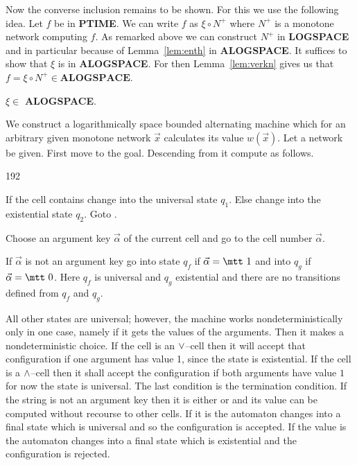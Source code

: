 Now the converse inclusion remains to be shown. For this we use
the following idea. Let $f$ be in \textbf{PTIME}. We can write $f$ as
$\xi \circ N^+$ where $N^+$ is a monotone network computing $f$. As
remarked above we can construct $N^+$ in \textbf{LOGSPACE} and in
particular because of Lemma~\ref{lem:enth} in \textbf{ALOGSPACE}.
It suffices to show that $\xi$ is in \textbf{ALOGSPACE}. For then
Lemma~\ref{lem:verkn} gives us that $f = \xi \circ N^+ \in 
\textbf{ALOGSPACE}$.
\begin{lem}
$\xi \in$ \textbf{ALOGSPACE}.
\end{lem}
\proofbeg
We construct a logarithmically space bounded alternating
machine which for an arbitrary given monotone network
$\vec{x}$ calculates its value $w(\vec{x})$. Let a network 
be given. First move to the goal. Descending from it
compute as follows.
\begin{dingautolist}{192}
\item
If the cell contains {\mtt{}} change into the universal 
state $q_1$. Else change into the existential state $q_2$. 
Goto .
\item
Choose an argument key $\vec{\alpha}$ of the current
cell and go to the cell number $\vec{\alpha}$.
\item
If $\vec{\alpha}$ is not an argument key go into state
$q_f$ if $\vec{\alpha} = \mbox{\mtt 1}$ and into $q_g$ if
$\vec{\alpha} = \mbox{\mtt 0}$.
Here $q_f$ is universal and $q_g$ existential
and there are no transitions defined from $q_f$ and $q_g$.
\end{dingautolist}
All other states are universal; however, the machine works
nondeterministically only in one case, namely if it gets the
values of the arguments. Then it makes a nondeterministic choice.
If the cell is an $\vee$--cell then it will accept that
configuration if one argument has value 1, since the state is
existential. If the cell is a $\wedge$--cell then it shall accept
the configuration if both arguments have value $1$ for now the
state is universal. The last condition is the termination
condition. If the string is not an argument key then it is either
{} or {} and its value can be computed without recourse
to other cells. If it is {} the automaton changes into a
final state which is universal and so the configuration is
accepted. If the value is {} the automaton changes into a
final state which is existential and the configuration is
rejected. 
\proofend

